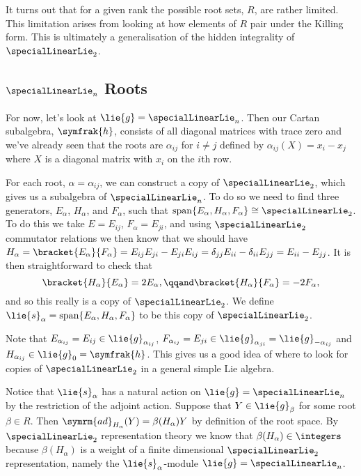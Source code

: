 \documentclass[fleqn]{NotesClass}
\newcommand{\isomorphic}{\cong}
\DeclareMathOperator{\Span}{span}
\newcommand{\ad}{\symrm{ad}}
\newcommand{\csa}{\symfrak{h}}
\begin{document}
    It turns out that for a given rank the possible root sets, \(R\), are rather limited.
    This limitation arises from looking at how elements of \(R\) pair under the Killing form.
    This is ultimately a generalisation of the hidden integrality of \(\specialLinearLie_2\).
    
    \subsection{\texorpdfstring{\(\specialLinearLie_n\)}{sln} Roots}
    For now, let's look at \(\lie{g} = \specialLinearLie_n\).
    Then our Cartan subalgebra, \(\csa\), consists of all diagonal matrices with trace zero and we've already seen that the roots are \(\alpha_{ij}\) for \(i \ne j\) defined by \(\alpha_{ij}(X) = x_i - x_j\) where \(X\) is a diagonal matrix with \(x_i\) on the \(i\)th row.
    
    For each root, \(\alpha = \alpha_{ij}\), we can construct a copy of \(\specialLinearLie_2\), which gives us a subalgebra of \(\specialLinearLie_n\).
    To do so we need to find three generators, \(E_\alpha\), \(H_\alpha\), and \(F_\alpha\), such that \(\Span\{E_\alpha, H_\alpha, F_\alpha\} \isomorphic \specialLinearLie_2\).
    To do this we take \(E = E_{ij}\), \(F_\alpha = E_{ji}\), and using \(\specialLinearLie_2\) commutator relations we then know that we should have \(H_\alpha = \bracket{E_\alpha}{F_\alpha} = E_{ij}E_{ji} - E_{ji}E_{ij} = \delta_{jj}E_{ii} - \delta_{ii}E_{jj} = E_{ii} - E_{jj}\).
    It is then straightforward to check that
    \begin{equation}
        \bracket{H_\alpha}{E_\alpha} = 2E_\alpha, \qqand \bracket{H_\alpha}{F_\alpha} = -2F_\alpha,
    \end{equation}
    and so this really is a copy of \(\specialLinearLie_2\).
    We define \(\lie{s}_\alpha = \Span\{E_\alpha, H_\alpha, F_\alpha\}\) to be this copy of \(\specialLinearLie_2\).
    
    Note that \(E_{\alpha_{ij}} = E_{ij} \in \lie{g}_{\alpha_{ij}}\), \(F_{\alpha_{ij}} = E_{ji} \in \lie{g}_{\alpha_{ji}} = \lie{g}_{-\alpha_{ij}}\) and \(H_{\alpha_{ij}} \in \lie{g}_0 = \csa\).
    This gives us a good idea of where to look for copies of \(\specialLinearLie_2\) in a general simple Lie algebra.
    
    Notice that \(\lie{s}_\alpha\) has a natural action on \(\lie{g} = \specialLinearLie_n\) by the restriction of the adjoint action.
    Suppose that \(Y \in \lie{g}_\beta\) for some root \(\beta \in R\).
    Then \(\ad_{H_\alpha}(Y) = \beta(H_\alpha)Y\) by definition of the root space.
    By \(\specialLinearLie_2\) representation theory we know that \(\beta(H_\alpha) \in \integers\) because \(\beta(H_\alpha)\) is a weight of a finite dimensional \(\specialLinearLie_2\) representation, namely the \(\lie{s}_\alpha\)-module \(\lie{g} = \specialLinearLie_n\).
    
\end{document}
